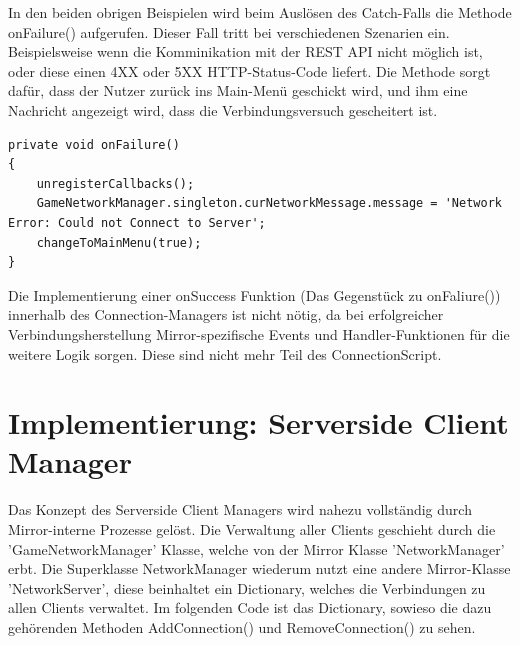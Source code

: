 In den beiden obrigen Beispielen wird beim Auslösen des Catch-Falls die Methode onFailure() aufgerufen. Dieser Fall tritt bei verschiedenen Szenarien ein. Beispielsweise wenn die Komminikation mit der REST API nicht möglich ist, oder diese einen 4XX oder 5XX HTTP-Status-Code liefert. Die Methode sorgt dafür, dass der Nutzer zurück ins Main-Menü geschickt wird, und ihm eine Nachricht angezeigt wird, dass die Verbindungsversuch gescheitert ist.

\begin{lstlisting}[caption= ConnectionScript.cs onFailure()]
private void onFailure()
{
	unregisterCallbacks();
	GameNetworkManager.singleton.curNetworkMessage.message = 'Network Error: Could not Connect to Server';
	changeToMainMenu(true);
}

\end{lstlisting}

Die Implementierung einer onSuccess Funktion (Das Gegenstück zu onFaliure()) innerhalb des Connection-Managers ist nicht nötig, da bei erfolgreicher Verbindungsherstellung Mirror-spezifische Events und Handler-Funktionen für die weitere Logik sorgen. Diese sind nicht mehr Teil des ConnectionScript.

\section{Implementierung: Serverside Client Manager}

Das Konzept des Serverside Client Managers wird nahezu vollständig durch Mirror-interne Prozesse gelöst. Die Verwaltung aller Clients geschieht durch die 'GameNetworkManager' Klasse, welche von der Mirror Klasse 'NetworkManager' erbt. Die Superklasse NetworkManager wiederum nutzt eine andere Mirror-Klasse 'NetworkServer', diese beinhaltet ein Dictionary, welches die Verbindungen zu allen Clients verwaltet. Im folgenden Code ist das Dictionary, sowieso die dazu gehörenden Methoden AddConnection() und RemoveConnection() zu sehen.


